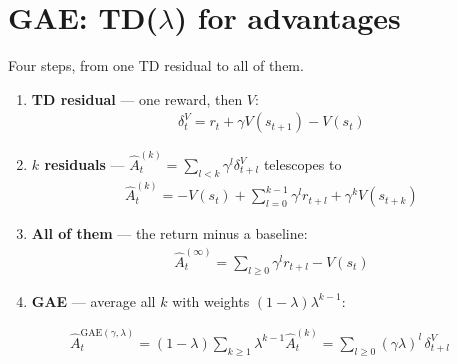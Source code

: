 \section{GAE: TD($\lambda$) for advantages}\label{sec:gae-def}

Four steps, from one TD residual to all of them.

\begin{enumerate}
  \item \textbf{TD residual} --- one reward, then $V$:
  \begin{gather*}
    \delta_t^V = r_t + \gamma V(s_{t+1}) - V(s_t)
  \end{gather*}
  \item \textbf{$k$ residuals} --- $\hat A_t^{(k)}=\sum_{l<k}\gamma^l\delta_{t+l}^V$ telescopes to
  \begin{gather*}
    \hat A_t^{(k)} = -V(s_t) + \textstyle\sum_{l=0}^{k-1}\gamma^l r_{t+l} + \gamma^k V(s_{t+k})
  \end{gather*}
  \item \textbf{All of them} --- the return minus a baseline:
  \begin{gather*}
    \hat A_t^{(\infty)} = \textstyle\sum_{l\ge0}\gamma^l r_{t+l} - V(s_t)
  \end{gather*}
  \item \textbf{GAE} --- average all $k$ with weights $(1-\lambda)\lambda^{k-1}$:
\end{enumerate}

\begin{eqbox}
\begin{gather*}
  \hat A_t^{\mathrm{GAE}(\gamma,\lambda)} = (1-\lambda)\textstyle\sum_{k\ge1}\lambda^{k-1}\hat A_t^{(k)} = \textstyle\sum_{l\ge0}(\gamma\lambda)^l\,\delta_{t+l}^V
\end{gather*}
\end{eqbox}

